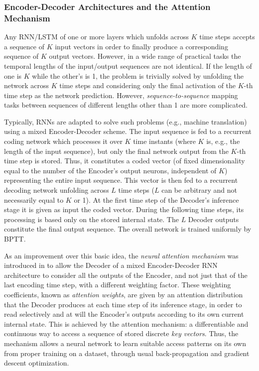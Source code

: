 \documentclass[preprint,review,10pt]{elsarticle}
\begin{document}
	\subsubsection{Encoder-Decoder Architectures and the Attention Mechanism}
	Any RNN/LSTM of one or more layers which unfolds across $K$ time steps accepts a sequence of $K$ input vectors in order to finally produce a corresponding sequence of $K$ output vectors. However, in a wide range of practical tasks the temporal lengths of the input/output sequences are not identical. If the length of one is $K$ while the other's is 1, the problem is trivially solved by unfolding the network across $K$ time steps and considering only the final activation of the $K$-th time step as the network prediction. However, \textit{sequence-to-sequence} mapping tasks between sequences of different lengths other than 1 are more complicated.
	
	Typically, RNNs are adapted to solve such problems (e.g., machine translation) using a mixed Encoder-Decoder scheme. The input sequence is fed to a recurrent coding network which processes it over $K$ time instants (where $K$ is, e.g., the length of the input sequence), but only the final network output from the $K$-th time step is stored. Thus, it constitutes a coded vector (of fixed dimensionality equal to the number of the Encoder's output neurons, independent of $K$) representing the entire input sequence. This vector is then fed to a recurrent decoding network unfolding across $L$ time steps ($L$ can be arbitrary and not necessarily equal to $K$ or 1). At the first time step of the Decoder's inference stage it is given as input the coded vector. During the following time steps, its processing is based only on the stored internal state. The $L$ Decoder outputs constitute the final output sequence. The overall network is trained uniformly by BPTT.
	
	As an improvement over this basic idea, the \textit{neural attention mechanism} was introduced in \cite{bahdanau} to allow the Decoder of a mixed Encoder-Decoder RNN architecture to consider all the outputs of the Encoder, and not just that of the last encoding time step, with a different weighting factor. These weighting coefficients, known as \textit{attention weights}, are given by an attention distribution that the Decoder produces at each time step of its inference stage, in order to read selectively and at will the Encoder's outputs according to its own current internal state. This is achieved by the attention mechanism: a differentiable and continuous way to access a sequence of stored discrete \textit{key vectors}. Thus, the mechanism allows a neural network to learn suitable access patterns on its own from proper training on a dataset, through usual back-propagation and gradient descent optimization.
	
\end{document}
